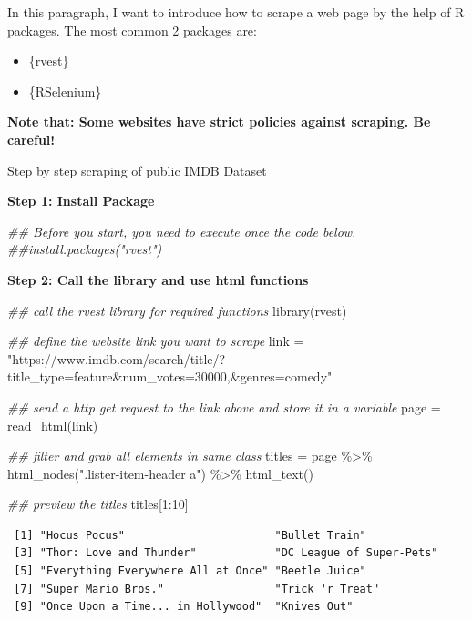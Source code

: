 \documentclass[
  letterpaper,
  DIV=11,
  numbers=noendperiod]{scrreprt}
\newenvironment{Shaded}{\begin{snugshade}}{\end{snugshade}}
\newcommand{\DecValTok}[1]{\textcolor[rgb]{0.68,0.00,0.00}{#1}}
\newcommand{\DocumentationTok}[1]{\textcolor[rgb]{0.37,0.37,0.37}{\textit{#1}}}
\newcommand{\FunctionTok}[1]{\textcolor[rgb]{0.28,0.35,0.67}{#1}}
\newcommand{\NormalTok}[1]{\textcolor[rgb]{0.00,0.23,0.31}{#1}}
\newcommand{\OtherTok}[1]{\textcolor[rgb]{0.00,0.23,0.31}{#1}}
\newcommand{\SpecialCharTok}[1]{\textcolor[rgb]{0.37,0.37,0.37}{#1}}
\newcommand{\StringTok}[1]{\textcolor[rgb]{0.13,0.47,0.30}{#1}}
\providecommand{\tightlist}{%
  \setlength{\itemsep}{0pt}\setlength{\parskip}{0pt}}\usepackage{longtable,booktabs,array}
\begin{document}
In this paragraph, I want to introduce how to scrape a web page by the
help of R packages. The most common 2 packages are:

\begin{itemize}
\tightlist
\item
  \{rvest\}
\item
  \{RSelenium\}
\end{itemize}

\textbf{Note that: Some websites have strict policies against scraping.
Be careful!}

Step by step scraping of public IMDB Dataset

\textbf{Step 1: Install Package}

\begin{Shaded}
\begin{Highlighting}[]
\DocumentationTok{\#\# Before you start, you need to execute once the code below.}
\DocumentationTok{\#\#install.packages("rvest")}
\end{Highlighting}
\end{Shaded}

\textbf{Step 2: Call the library and use html functions}

\begin{Shaded}
\begin{Highlighting}[]
\DocumentationTok{\#\# call the rvest library for required functions}
\FunctionTok{library}\NormalTok{(rvest)}

\DocumentationTok{\#\# define the website link you want to scrape}
\NormalTok{link }\OtherTok{=} \StringTok{"https://www.imdb.com/search/title/?title\_type=feature\&num\_votes=30000,\&genres=comedy"}

\DocumentationTok{\#\# send a http get request to the link above and store it in a variable}
\NormalTok{page }\OtherTok{=} \FunctionTok{read\_html}\NormalTok{(link)}

\DocumentationTok{\#\# filter and grab all elements in same class}
\NormalTok{titles }\OtherTok{=}\NormalTok{ page }\SpecialCharTok{\%\textgreater{}\%} \FunctionTok{html\_nodes}\NormalTok{(}\StringTok{".lister{-}item{-}header a"}\NormalTok{) }\SpecialCharTok{\%\textgreater{}\%} \FunctionTok{html\_text}\NormalTok{()}

\DocumentationTok{\#\# preview the titles}
\NormalTok{titles[}\DecValTok{1}\SpecialCharTok{:}\DecValTok{10}\NormalTok{]}
\end{Highlighting}
\end{Shaded}

\begin{verbatim}
 [1] "Hocus Pocus"                       "Bullet Train"                     
 [3] "Thor: Love and Thunder"            "DC League of Super-Pets"          
 [5] "Everything Everywhere All at Once" "Beetle Juice"                     
 [7] "Super Mario Bros."                 "Trick 'r Treat"                   
 [9] "Once Upon a Time... in Hollywood"  "Knives Out"                       
\end{verbatim}
\end{document}
